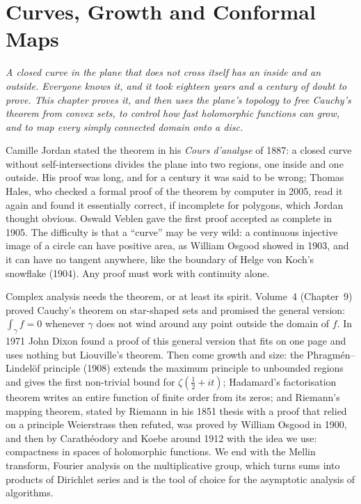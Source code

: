 \chapter{Curves, Growth and Conformal Maps}

\begin{center}\itshape
A closed curve in the plane that does not cross itself has an inside and an outside. Everyone knows it, and it took eighteen years
and a century of doubt to prove. This chapter proves it, and then uses the plane's topology to free Cauchy's theorem from convex sets, to control how fast
holomorphic functions can grow, and to map every simply connected domain onto a disc.
\end{center}

Camille Jordan stated the theorem in his \emph{Cours d'analyse} of 1887: a closed curve without self-intersections divides the plane into two
regions, one inside and one outside. His proof was long, and for a century it was said to be wrong; Thomas Hales, who checked a
formal proof of the theorem by computer in 2005, read it again and found it essentially correct, if incomplete for polygons, which
Jordan thought obvious. Oswald Veblen gave the first proof accepted as complete in 1905. The difficulty is that a ``curve'' may be
very wild: a continuous injective image of a circle can have positive area, as William Osgood showed in 1903, and it can have no tangent anywhere, like the boundary of Helge von Koch's
snowflake (1904).
Any proof must work with continuity alone.

Complex analysis needs the theorem, or at least its spirit. Volume~4 (Chapter~9) proved Cauchy's theorem on star-shaped sets and promised the
general version: $\int_\gamma f=0$ whenever $\gamma$ does not wind around any point outside the domain of $f$. In 1971 John Dixon found a proof of this
general version that fits on one page and uses nothing but Liouville's theorem. Then come growth and size: the Phragm\'en--Lindel\"of principle
(1908) extends the maximum principle to unbounded regions and gives the first non-trivial bound for $\zeta(\frac12+it)$; Hadamard's
factorisation theorem writes an entire function of finite order from its zeros; and Riemann's mapping theorem, stated by Riemann in his 1851
thesis with a proof that relied on a principle Weierstrass then refuted, was proved by William Osgood in 1900, and then by Carath\'eodory and Koebe
around 1912 with the idea we use: compactness in spaces of holomorphic functions. We end with the Mellin transform, Fourier analysis on the multiplicative group, which turns sums into
products of Dirichlet series and is the tool of choice for the asymptotic analysis of algorithms.

